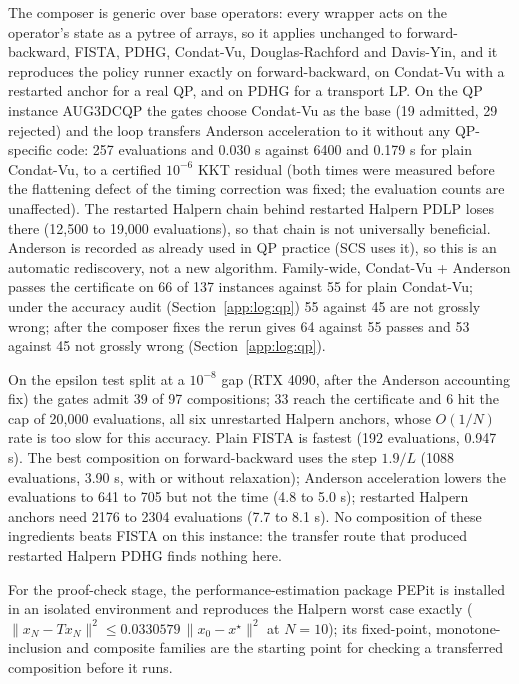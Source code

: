 \documentclass[11pt]{article}
\begin{document}
The composer is generic over base operators: every wrapper acts on the
operator's state as a pytree of arrays, so it applies unchanged to forward-backward, FISTA,
PDHG, Condat-Vu, Douglas-Rachford and Davis-Yin, and it reproduces the policy
runner exactly on forward-backward, on Condat-Vu with a restarted anchor for a
real QP, and on PDHG for a transport LP. On the QP instance AUG3DCQP the gates
choose Condat-Vu as the base (19 admitted, 29 rejected) and the loop transfers
Anderson acceleration to it without any QP-specific code: 257 evaluations and
0.030 s against 6400 and 0.179 s for plain Condat-Vu, to a certified $10^{-6}$
KKT residual (both times were measured before the flattening defect of
the timing correction was fixed; the evaluation counts are unaffected). The restarted Halpern chain behind restarted Halpern PDLP loses
there (12,500 to 19,000 evaluations), so that chain is not universally
beneficial. Anderson is recorded as already used in QP practice (SCS uses it),
so this is an automatic rediscovery, not a new algorithm. Family-wide, Condat-Vu + Anderson passes the
certificate on 66 of 137 instances against 55 for plain Condat-Vu; under the
accuracy audit (Section~\ref{app:log:qp}) 55 against 45 are not grossly
wrong; after the composer fixes the rerun gives 64 against 55 passes and 53
against 45 not grossly wrong (Section~\ref{app:log:qp}).

On the epsilon test split at a $10^{-8}$ gap (RTX 4090, after the Anderson accounting fix)
the gates admit 39 of 97 compositions; 33 reach the certificate and 6 hit the cap of
20,000 evaluations, all six unrestarted Halpern anchors, whose $O(1/N)$ rate is too slow
for this accuracy. Plain FISTA is fastest (192 evaluations, 0.947 s). The best
composition on forward-backward uses the step $1.9/L$ (1088 evaluations, 3.90 s, with or
without relaxation); Anderson acceleration lowers the evaluations to 641 to 705 but not
the time (4.8 to 5.0 s); restarted Halpern anchors need 2176 to 2304 evaluations (7.7 to
8.1 s). No composition of these ingredients beats FISTA on this instance: the transfer
route that produced restarted Halpern PDHG finds nothing here.

For the proof-check stage, the performance-estimation package PEPit is
installed in an isolated environment and reproduces the Halpern worst case
exactly ($\|x_N - T x_N\|^2 \le 0.0330579\,\|x_0 - x^\star\|^2$ at $N = 10$); its
fixed-point, monotone-inclusion and composite families are the starting point
for checking a transferred composition before it runs.
\end{document}
